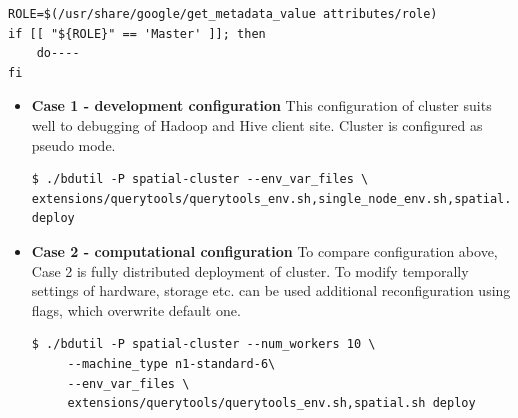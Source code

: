 \documentclass[a4paper,12pt,oneside]{report}
\begin{document}
 \begin{footnotesize}
\begin{lstlisting}[style=python]
ROLE=$(/usr/share/google/get_metadata_value attributes/role)
if [[ "${ROLE}" == 'Master' ]]; then 
	do----
fi
\end{lstlisting}
\end{footnotesize}
 


 
\begin{itemize}
\item \textbf{Case 1 - development configuration}  This configuration of cluster suits well to debugging 
of Hadoop and Hive client site. Cluster is configured as pseudo mode.
\begin{footnotesize}
\begin{lstlisting}[style=python]
$ ./bdutil -P spatial-cluster --env_var_files \
extensions/querytools/querytools_env.sh,single_node_env.sh,spatial.sh deploy
\end{lstlisting}
\end{footnotesize}


\item \textbf{Case 2 - computational configuration}  To compare configuration above, Case 2 is fully 
distributed deployment of cluster. To modify temporally settings of hardware, storage etc. can be used 
additional reconfiguration using flags, which overwrite default one.
%
\begin{footnotesize}
\begin{lstlisting}[style=python]
$ ./bdutil -P spatial-cluster --num_workers 10 \
     --machine_type n1-standard-6\
     --env_var_files \
     extensions/querytools/querytools_env.sh,spatial.sh deploy
\end{lstlisting}
\end{footnotesize}
\end{itemize}
\end{document}
